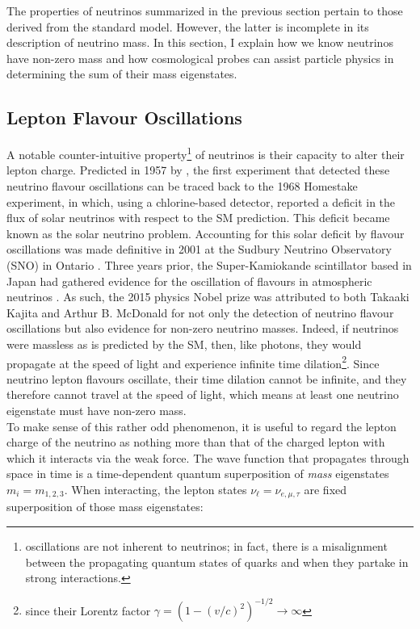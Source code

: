 The properties of neutrinos summarized in the previous section pertain to those derived from the standard model. However, the latter is incomplete in its description of neutrino mass. In this section, I explain how we know neutrinos have non-zero mass and how cosmological probes can assist particle physics in determining the sum of their mass eigenstates.

\subsection{Lepton Flavour Oscillations}
\label{sec:leptonmix}


A notable counter-intuitive property\footnote{oscillations are not inherent to neutrinos; in fact, there is a misalignment between the propagating quantum states of quarks and when they partake in strong interactions.} of neutrinos is their capacity to alter their lepton charge. Predicted in 1957 by \cite{Pontecorvo57, Pontecorvo58}, the first experiment that detected these neutrino flavour oscillations can be traced back to the 1968 Homestake experiment, in which, using a chlorine-based detector, \cite{Davis68} reported a deficit in the flux of solar neutrinos with respect to the SM prediction. This deficit became known as the solar neutrino problem. Accounting for this solar deficit by flavour oscillations was made definitive in 2001 at the Sudbury Neutrino Observatory (SNO) in Ontario \citep{Sudbury_osc}. Three years prior, the Super-Kamiokande scintillator based in Japan had gathered evidence for the oscillation of flavours in atmospheric neutrinos \citep{Fukuda1998, Kajita1999}. As such, the 2015 physics Nobel prize was attributed to both Takaaki Kajita and Arthur B. McDonald for not only the detection of neutrino flavour oscillations but also evidence for non-zero neutrino masses. Indeed, if neutrinos were massless as is predicted by the SM, then, like photons, they would propagate at the speed of light and experience infinite time dilation\footnote{since their Lorentz factor $\gamma = (1-(v/c)^2)^{-1/2} \rightarrow \infty$}. Since neutrino lepton flavours oscillate, their time dilation cannot be infinite, and they therefore cannot travel at the speed of light, which means at least one neutrino eigenstate must have non-zero mass. \\

To make sense of this rather odd phenomenon, it is useful to regard the lepton charge of the neutrino as nothing more than that of the charged lepton with which it interacts via the weak force. The wave function that propagates through space in time is a time-dependent quantum superposition of \textit{mass} eigenstates $m_i = m_{1,2,3}$. When interacting, the lepton states $\nu_\ell = \nu_{e, \mu, \tau}$ are fixed superposition of those mass eigenstates:


